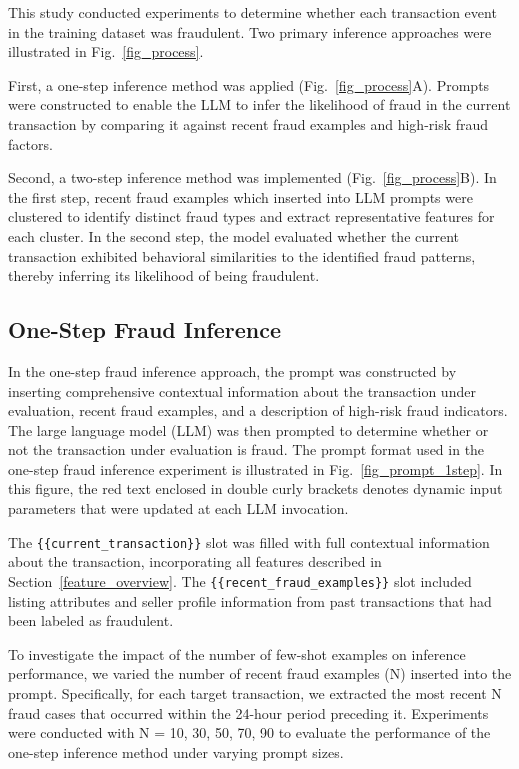 \documentclass[sigconf]{acmart}
\begin{document}
This study conducted experiments to determine whether each transaction event in the training dataset was fraudulent. Two primary inference approaches were illustrated in Fig.~\ref{fig_process}.

First, a one-step inference method was applied (Fig.~\ref{fig_process}A). Prompts were constructed to enable the LLM to infer the likelihood of fraud in the current transaction by comparing it against recent fraud examples and high-risk fraud factors.

Second, a two-step inference method was implemented (Fig.~\ref{fig_process}B). In the first step, recent fraud examples which inserted into LLM prompts were clustered to identify distinct fraud types and extract representative features for each cluster. In the second step, the model evaluated whether the current transaction exhibited behavioral similarities to the identified fraud patterns, thereby inferring its likelihood of being fraudulent.



\subsection{One-Step Fraud Inference}

In the one-step fraud inference approach, the prompt was constructed by inserting comprehensive contextual information about the transaction under evaluation, recent fraud examples, and a description of high-risk fraud indicators. The large language model (LLM) was then prompted to determine whether or not the transaction under evaluation is fraud. The prompt format used in the one-step fraud inference experiment is illustrated in Fig.~\ref{fig_prompt_1step}. In this figure, the red text enclosed in double curly brackets denotes dynamic input parameters that were updated at each LLM invocation.

The \texttt{\{\{current\_transaction\}\}} slot was filled with full contextual information about the transaction, incorporating all features described in Section~\ref{feature_overview}. The \texttt{\{\{recent\_fraud\_examples\}\}} slot included listing attributes and seller profile information from past transactions that had been labeled as fraudulent.

To investigate the impact of the number of few-shot examples on inference performance, we varied the number of recent fraud examples (N) inserted into the prompt. Specifically, for each target transaction, we extracted the most recent N fraud cases that occurred within the 24-hour period preceding it. Experiments were conducted with N = 10, 30, 50, 70, 90 to evaluate the performance of the one-step inference method under varying prompt sizes.
\end{document}
